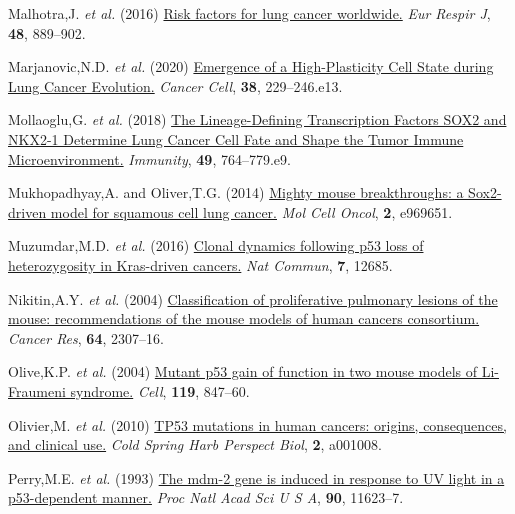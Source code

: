 \begin{CSLReferences}{1}{0}
\leavevmode{}%
Malhotra,J. \emph{et al.} (2016) \href{https://doi.org/10.1183/13993003.00359-2016}{Risk factors for lung cancer worldwide.} \emph{Eur Respir J}, \textbf{48}, 889--902.

\leavevmode{}%
Marjanovic,N.D. \emph{et al.} (2020) \href{https://doi.org/10.1016/j.ccell.2020.06.012}{Emergence of a High-Plasticity Cell State during Lung Cancer Evolution.} \emph{Cancer Cell}, \textbf{38}, 229--246.e13.

\leavevmode{}%
Mollaoglu,G. \emph{et al.} (2018) \href{https://doi.org/10.1016/j.immuni.2018.09.020}{The Lineage-Defining Transcription Factors SOX2 and NKX2-1 Determine Lung Cancer Cell Fate and Shape the Tumor Immune Microenvironment.} \emph{Immunity}, \textbf{49}, 764--779.e9.

\leavevmode{}%
Mukhopadhyay,A. and Oliver,T.G. (2014) \href{https://doi.org/10.4161/23723548.2014.969651}{Mighty mouse breakthroughs: a Sox2-driven model for squamous cell lung cancer.} \emph{Mol Cell Oncol}, \textbf{2}, e969651.

\leavevmode{}%
Muzumdar,M.D. \emph{et al.} (2016) \href{https://doi.org/10.1038/ncomms12685}{Clonal dynamics following p53 loss of heterozygosity in Kras-driven cancers.} \emph{Nat Commun}, \textbf{7}, 12685.

\leavevmode{}%
Nikitin,A.Y. \emph{et al.} (2004) \href{https://doi.org/10.1158/0008-5472.can-03-3376}{Classification of proliferative pulmonary lesions of the mouse: recommendations of the mouse models of human cancers consortium.} \emph{Cancer Res}, \textbf{64}, 2307--16.

\leavevmode{}%
Olive,K.P. \emph{et al.} (2004) \href{https://doi.org/10.1016/j.cell.2004.11.004}{Mutant p53 gain of function in two mouse models of Li-Fraumeni syndrome.} \emph{Cell}, \textbf{119}, 847--60.

\leavevmode{}%
Olivier,M. \emph{et al.} (2010) \href{https://doi.org/10.1101/cshperspect.a001008}{TP53 mutations in human cancers: origins, consequences, and clinical use.} \emph{Cold Spring Harb Perspect Biol}, \textbf{2}, a001008.

\leavevmode{}%
Perry,M.E. \emph{et al.} (1993) \href{https://doi.org/10.1073/pnas.90.24.11623}{The mdm-2 gene is induced in response to UV light in a p53-dependent manner.} \emph{Proc Natl Acad Sci U S A}, \textbf{90}, 11623--7.


\end{CSLReferences}

